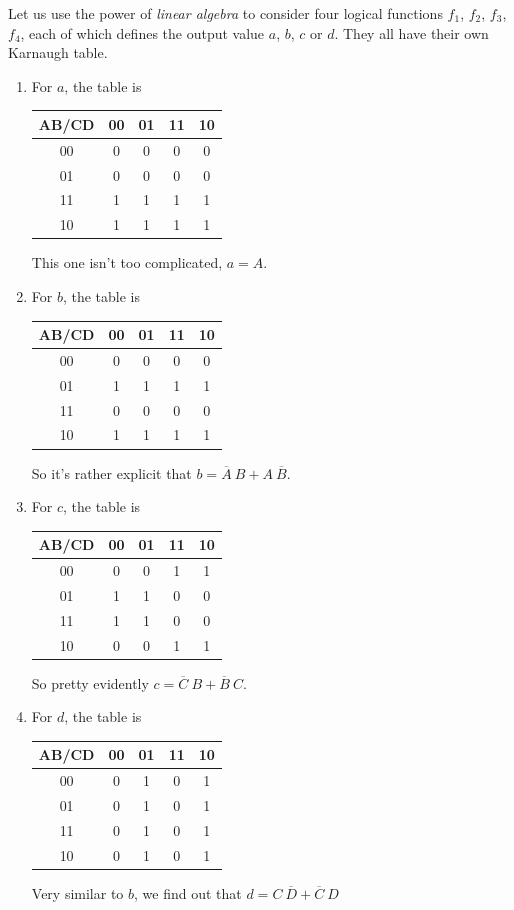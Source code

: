 \documentclass[a4paper,10pt]{article}
\begin{document}
Let us use the power of \textit{linear algebra} to consider four logical functions $f_1$, $f_2$, $f_3$, $f_4$, each of which defines the output value $a$, $b$, $c$ or $d$. They all have their own Karnaugh table.
\begin{enumerate}
	\item For $a$, the table is
		\begin{center}
			\begin{tabular}{|c|c|c|c|c|}
				\hline
				AB/CD&00&01&11&10\\\hline
				00&0&0&0&0\\\hline
				01&0&0&0&0\\\hline
				11&1&1&1&1\\\hline
				10&1&1&1&1\\\hline
			\end{tabular}
		\end{center}
		This one isn't too complicated, $a=A$.
	\item For $b$, the table is
		\begin{center}
			\begin{tabular}{|c|c|c|c|c|}
				\hline
				AB/CD&00&01&11&10\\\hline
				00&0&0&0&0\\\hline
				01&1&1&1&1\\\hline
				11&0&0&0&0\\\hline
				10&1&1&1&1\\\hline
			\end{tabular}
		\end{center}
		So it's rather explicit that $b=\overline{A}~B+A~\overline{B}$.
	\item For $c$, the table is
		\begin{center}
			\begin{tabular}{|c|c|c|c|c|}
				\hline
				AB/CD&00&01&11&10\\\hline
				00&0&0&1&1\\\hline
				01&1&1&0&0\\\hline
				11&1&1&0&0\\\hline
				10&0&0&1&1\\\hline
			\end{tabular}
		\end{center}
		So pretty evidently $c=\overline{C}~B+\overline{B}~C$.
	\item For $d$, the table is
		\begin{center}
			\begin{tabular}{|c|c|c|c|c|}
				\hline
				AB/CD&00&01&11&10\\\hline
				00&0&1&0&1\\\hline
				01&0&1&0&1\\\hline
				11&0&1&0&1\\\hline
				10&0&1&0&1\\\hline
			\end{tabular}
		\end{center}
		Very similar to $b$, we find out that $d=C~\overline{D}+\overline{C}~D$
\end{enumerate}
\end{document}
